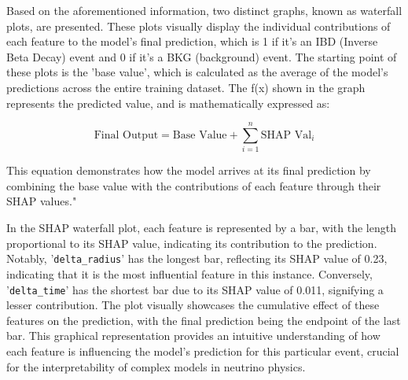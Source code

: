 Based on the aforementioned information, two distinct graphs, known as waterfall plots, are presented. These plots visually display the individual contributions of each feature to the model's final prediction, which is 1 if it's an IBD (Inverse Beta Decay) event and 0 if it's a BKG (background) event. The starting point of these plots is the 'base value', which is calculated as the average of the model's predictions across the entire training dataset. The f(x) shown in the graph represents the predicted value, and is mathematically expressed as:

\begin{equation}
	\text{Final Output} = \text{Base Value} + \sum_{i=1}^{n} \text{SHAP Val}_{i}
\end{equation}

This equation demonstrates how the model arrives at its final prediction by combining the base value with the contributions of each feature through their SHAP values."

In the SHAP waterfall plot, each feature is represented by a bar, with the length proportional to its SHAP value, indicating its contribution to the prediction. Notably, '\texttt{delta\_radius}' has the longest bar, reflecting its SHAP value of 0.23, indicating that it is the most influential feature in this instance. Conversely, '\texttt{delta\_time}' has the shortest bar due to its SHAP value of 0.011, signifying a lesser contribution. The plot visually showcases the cumulative effect of these features on the prediction, with the final prediction being the endpoint of the last bar. This graphical representation provides an intuitive understanding of how each feature is influencing the model's prediction for this particular event, crucial for the interpretability of complex models in neutrino physics.


\begin{figure}[h!]
	\centering
	
\end{figure}




